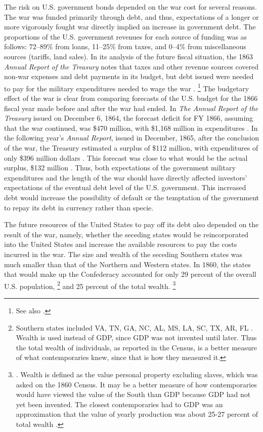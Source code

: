The risk on U.S. government bonds depended on the war cost for several reasons.
The  war was funded primarily through debt, and thus, expectations of a longer or more vigorously fought war directly implied an increase in government debt.
The proportions of the U.S. government revenues for each source of funding was as follows: 72--89\% from loans, 11--25\% from taxes, and 0--4\% from miscellaneous sources (tariffs, land sales).
In its analysis of the future fiscal situation, the 1863 \textit{Annual Report of the Treasury} notes that taxes and other revenue sources covered non-war expenses and debt payments in its budget, but debt issued were needed to pay for the military expenditures needed to wage the war \parencite[10-13]{Treasury1863}.
\footnote{See also \textcite[][14]{Godfrey1976}.}
The budgetary effect of the war is clear from  comparing forecasts of the U.S. budget for the 1866 fiscal year made before and after the war had ended.
In \textit{The Annual Report of the  Treasury} issued on December 6, 1864, the forecast deficit for FY 1866, assuming that the war continued, was \$470 million, with \$1,168 million in expenditures \parencite[13]{Treasury1864}.
In the following year's \textit{Annual Report}, issued in December, 1865, after the conclusion of the war, the Treasury estimated a surplus of \$112 million, with expenditures of only \$396 million dollars \parencite{Treasury1865}.
This forecast was close to what would be the actual surplus, \$132 million \parencite[2]{Treasury1866}.
Thus, both expectations of the government military expenditures and the length of the war should have directly affected investors' expectations of the eventual debt level of the U.S. government.
This increased debt would increase the possibility of default or the temptation of the government to repay its debt in currency rather than specie.

The future resources of the United States to pay off its debt also depended on the result of the war, namely, whether the seceding states would be reincorporated into the United States and increase the available resources to pay the  costs incurred in the war.
The size and wealth of the seceding Southern states was much smaller than that of the Northern and Western states.
In 1860, the states that would make up the Confederacy accounted for only 29 percent of the overall U.S. population,%
\footnote{
  Southern states included VA, TN, GA, NC, AL, MS, LA, SC, TX, AR, FL \parencite[5]{Eicher2001}.
  Wealth is used instead of GDP, since GDP was not invented until later.
  Thus the total wealth of individuals, as reported in the Census, is a better measure of what contemporaries knew, since that is how they measured it.
}
and 25 percent of the total wealth.%
\footnote{
  \textcite[12]{Elder1865}. Wealth is defined as the value personal property excluding slaves, which was asked on the 1860 Census.
  It may be a better measure of how contemporaries would have viewed the value of the South than GDP because GDP had not yet been invented.
  The closest contemporaries had to GDP was an approximation that the value of yearly production was about 25-27 percent of total wealth \parencites[7]{Elder1865}[24]{Treasury1865}.
}

